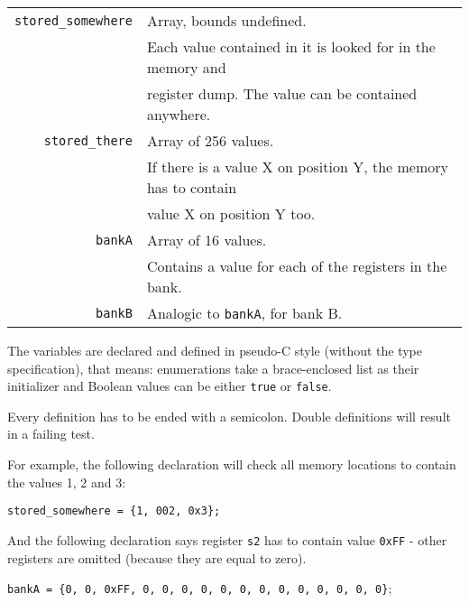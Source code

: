             \begin{center}
            \begin{tabular}{ r | l }
                \texttt{stored\_somewhere} & Array, bounds undefined. \\
                & Each value contained in it is looked for in the memory and \\
                & register dump. The value can be contained anywhere. \\

                \texttt{stored\_there} & Array of 256 values. \\
                & If there is a value X on position Y, the memory has to contain \\
                & value X on position Y too. \\

                \texttt{bankA} & Array of 16 values. \\
                & Contains a value for each of the registers in the bank. \\

                \texttt{bankB} & Analogic to \texttt{bankA}, for bank B.

            \end{tabular}
            \end{center}

            The variables are declared and defined in pseudo-C style (without the type specification), that means: enumerations take a brace-enclosed list as their initializer and Boolean values can be either \texttt{true} or \texttt{false}.

            Every definition has to be ended with a semicolon. Double definitions will result in a failing test.

            For example, the following declaration will check all memory locations to contain the values 1, 2 and 3:

            \begin{center}
                \texttt{stored\_somewhere = \{1, 002, 0x3\};}
            \end{center}

            And the following declaration says register \texttt{s2} has to contain value \texttt{0xFF} - other registers are omitted (because they are equal to zero).

            \begin{center}
                \texttt{bankA = \{0, 0, 0xFF, 0, 0, 0, 0, 0, 0, 0, 0, 0, 0, 0, 0, 0\}};
            \end{center}
\newpage
